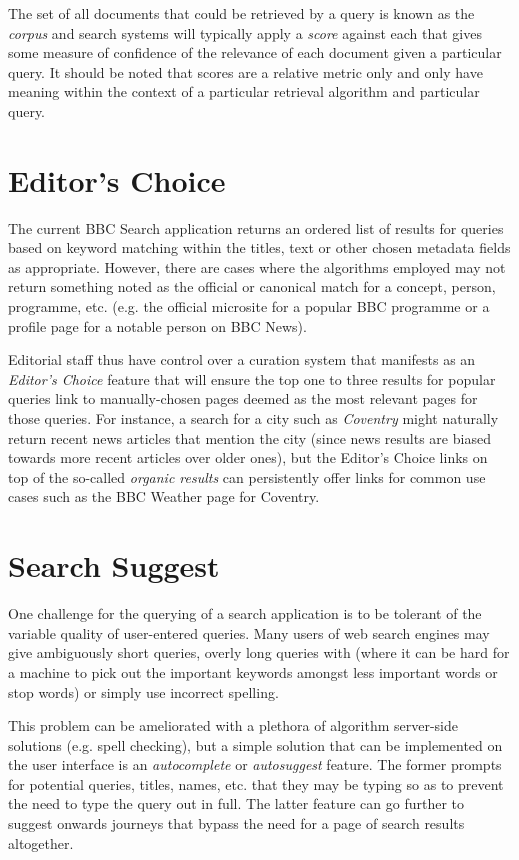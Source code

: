 The set of all documents that could be retrieved by a query is known as the
\emph{corpus} and search systems will typically apply a \emph{score} against
each that gives some measure of confidence of the relevance of each document
given a particular query. It should be noted that scores are a relative
metric only and only have meaning within the context of a particular
retrieval algorithm and particular query.

\section{Editor's Choice}

The current BBC Search application returns an ordered list of results
for queries based on keyword matching within the titles, text or other
chosen metadata fields as appropriate. However, there are cases where
the algorithms employed may not return something noted as the official
or canonical match for a concept, person, programme, etc. (e.g. the
official microsite for a popular BBC programme or a profile page for
a notable person on BBC News).

Editorial staff thus have control over a curation system that manifests
as an \emph{Editor's Choice} feature that will ensure the top one to three
results for popular queries link to manually-chosen pages deemed as the most
relevant pages for those queries. For instance, a search for a city such
as \emph{Coventry} might naturally return recent news articles that mention the
city (since news results are biased towards more recent articles over older
ones), but the Editor's Choice links on top of the so-called \emph{organic
results} can persistently offer links for common use cases such as
the BBC Weather page for Coventry.

\section{Search Suggest}

One challenge for the querying of a search application is to be tolerant
of the variable quality of user-entered queries. Many users of web search
engines may give ambiguously short queries, overly long queries with (where
it can be hard for a machine to pick out the important keywords amongst
less important words or stop words\cite{rajaraman2011data})
or simply use incorrect spelling.

This problem can be ameliorated with a plethora of algorithm
server-side solutions (e.g. spell checking), but a simple solution that
can be implemented on the user interface is an \emph{autocomplete}
or \emph{autosuggest} feature. The former prompts for potential
queries, titles, names, etc. that they may be typing so as to prevent
the need to type the query out in full. The latter feature can go
further to suggest onwards journeys that bypass the need for a
page of search results altogether.

